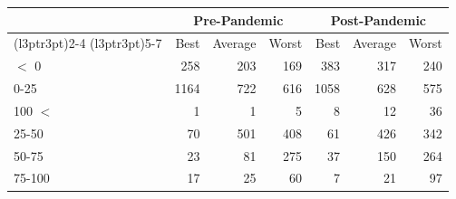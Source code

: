 
\begin{tabular}[t]{lrrrrrr}
\toprule
\multicolumn{1}{c}{ } & \multicolumn{3}{c}{Pre-Pandemic} & \multicolumn{3}{c}{Post-Pandemic} \\
\cmidrule(l{3pt}r{3pt}){2-4} \cmidrule(l{3pt}r{3pt}){5-7}
 & Best & Average & Worst & Best & Average & Worst\\
\midrule
$<$ 0 & 258 & 203 & 169 & 383 & 317 & 240\\
0-25 & 1164 & 722 & 616 & 1058 & 628 & 575\\
100 $<$ & 1 & 1 & 5 & 8 & 12 & 36\\
25-50 & 70 & 501 & 408 & 61 & 426 & 342\\
50-75 & 23 & 81 & 275 & 37 & 150 & 264\\
75-100 & 17 & 25 & 60 & 7 & 21 & 97\\
\bottomrule
\end{tabular}

